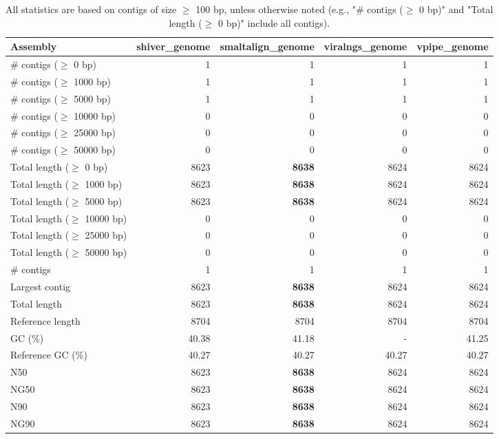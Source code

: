 \documentclass[12pt,a4paper]{article}
\begin{document}
\begin{table}[ht]
\begin{center}
\caption{All statistics are based on contigs of size $\geq$ 100 bp, unless otherwise noted (e.g., "\# contigs ($\geq$ 0 bp)" and "Total length ($\geq$ 0 bp)" include all contigs).}
\begin{tabular}{|l*{4}{|r}|}
\hline
Assembly & shiver\_genome & smaltalign\_genome & viralngs\_genome & vpipe\_genome \\ \hline
\# contigs ($\geq$ 0 bp) & 1 & 1 & 1 & 1 \\ \hline
\# contigs ($\geq$ 1000 bp) & 1 & 1 & 1 & 1 \\ \hline
\# contigs ($\geq$ 5000 bp) & 1 & 1 & 1 & 1 \\ \hline
\# contigs ($\geq$ 10000 bp) & 0 & 0 & 0 & 0 \\ \hline
\# contigs ($\geq$ 25000 bp) & 0 & 0 & 0 & 0 \\ \hline
\# contigs ($\geq$ 50000 bp) & 0 & 0 & 0 & 0 \\ \hline
Total length ($\geq$ 0 bp) & 8623 & {\bf 8638} & 8624 & 8624 \\ \hline
Total length ($\geq$ 1000 bp) & 8623 & {\bf 8638} & 8624 & 8624 \\ \hline
Total length ($\geq$ 5000 bp) & 8623 & {\bf 8638} & 8624 & 8624 \\ \hline
Total length ($\geq$ 10000 bp) & 0 & 0 & 0 & 0 \\ \hline
Total length ($\geq$ 25000 bp) & 0 & 0 & 0 & 0 \\ \hline
Total length ($\geq$ 50000 bp) & 0 & 0 & 0 & 0 \\ \hline
\# contigs & 1 & 1 & 1 & 1 \\ \hline
Largest contig & 8623 & {\bf 8638} & 8624 & 8624 \\ \hline
Total length & 8623 & {\bf 8638} & 8624 & 8624 \\ \hline
Reference length & 8704 & 8704 & 8704 & 8704 \\ \hline
GC (\%) & 40.38 & 41.18 & - & 41.25 \\ \hline
Reference GC (\%) & 40.27 & 40.27 & 40.27 & 40.27 \\ \hline
N50 & 8623 & {\bf 8638} & 8624 & 8624 \\ \hline
NG50 & 8623 & {\bf 8638} & 8624 & 8624 \\ \hline
N90 & 8623 & {\bf 8638} & 8624 & 8624 \\ \hline
NG90 & 8623 & {\bf 8638} & 8624 & 8624 \\ \hline

\end{tabular}
\end{center}
\end{table}
\end{document}
